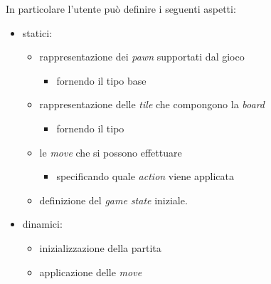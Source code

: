 In particolare l'utente può definire i seguenti aspetti:

\begin{itemize}
    \item statici:
    \begin{itemize}
        \item rappresentazione dei \textit{pawn} supportati dal gioco
        \begin{itemize}
            \item fornendo il tipo base
        \end{itemize}
        \item rappresentazione delle \textit{tile} che compongono la \textit{board}
        \begin{itemize}
            \item fornendo il tipo
        \end{itemize}
        \item le \textit{move} che si possono effettuare
        \begin{itemize}
            \item specificando quale \textit{action} viene applicata
        \end{itemize}
        \item definizione del \textit{game state} iniziale.
    \end{itemize}

    \item dinamici:
    \begin{itemize}
        \item inizializzazione della partita
        \item applicazione delle \textit{move}
    \end{itemize}
\end{itemize}


